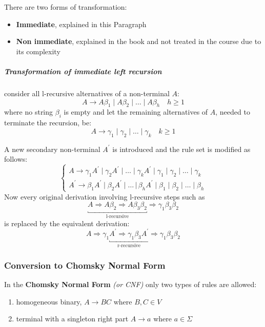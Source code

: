 \documentclass[english]{article}
\begin{document}
There are two forms of transformation:
\begin{itemize}
  \item \textbf{Immediate}, explained in this Paragraph
  \item \textbf{Non immediate}, explained in the book and not treated in the course due to its complexity
\end{itemize}

\subparagraph*{Transformation of immediate left recursion}

consider all l-recursive alternatives of a non-terminal \(A\):
\[ A \rightarrow A \beta_1 \mid A \beta_2 \mid \ldots \mid A \beta_h \quad h \geq 1 \]
where no string \(\beta_i\) is empty and let the remaining alternatives of \(A\), needed to terminate the recursion, be:
\[ A \rightarrow \gamma_1 \mid \gamma_2 \mid \ldots \mid \gamma_k \quad k \geq 1 \]

A new secondary non-terminal \(A^\prime\) is introduced and the rule set is modified as follows:
\[\begin{cases}
    A \rightarrow \gamma_1 A^\prime \mid \gamma_2 A^\prime \mid \ldots \mid \gamma_k A^\prime \mid \gamma_1 \mid \gamma_2 \mid \ldots \mid \gamma_k \\
    A^\prime \rightarrow \beta_1 A^\prime \mid \beta_2 A^\prime \mid \ldots \, |\, \beta_h A^\prime \mid \beta_1 \mid \beta_2 \mid \ldots \mid \beta_h
  \end{cases}\]
Now every original derivation involving l-recursive steps such as
\[\underbracket{A \Rightarrow A \beta_2 \Rightarrow A \beta_3 \beta_2}_{\text{l-recursive}} \Rightarrow \gamma_1 \beta_3 \beta_2 \]
is replaced by the equivalent derivation:
\[A \Rightarrow \gamma_1 \underbracket{A^\prime \Rightarrow \gamma_1 \beta_3 A^\prime}_{\text{r-recursive}} \Rightarrow \gamma_1 \beta_3 \beta_2 \]

\subsubsection{Conversion to Chomsky Normal Form}
\label{sec:conversion-to-chomsky-normal-form}

In the \textbf{Chomsky Normal Form} \textit{(or CNF)} only two types of rules are allowed:

\begin{enumerate}
  \item homogeneous binary, \(A \rightarrow BC\) where \(B, C \in V\)
  \item terminal with a singleton right part \(A \rightarrow a\) where \(a \in \Sigma\)
\end{enumerate}
\end{document}
